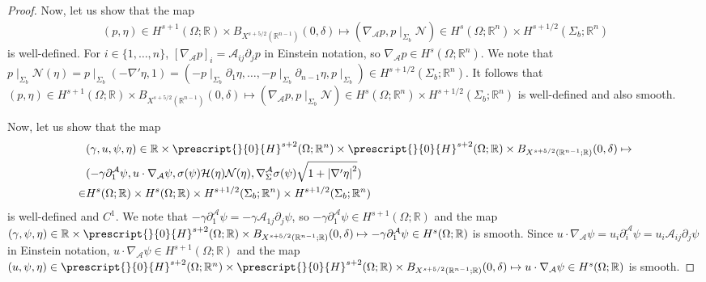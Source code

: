 \documentclass[11pt,letterpaper,reqno]{amsart}
\numberwithin{equation}{section}
\newcommand{\abs}[1]{\left\lvert#1\right\rvert}
\begin{document}
\begin{proof}
    Now, let us show that the map
    \begin{align}
        (p,\eta)\in H^{s+1}(\Omega;\mathbb{R}) \times B_{X^{s+5/2}(\mathbb{R}^{n-1})}(0,\delta) \mapsto (\nabla_{\mathcal{A}}p, p\mid_{\Sigma_{b}}\mathcal{N})\in H^{s}(\Omega;\mathbb{R}^{n}) \times H^{s+1/2}(\Sigma_{b};\mathbb{R}^{n})
    \end{align}
    is well-defined. For \(i \in \{1, \dots, n\}\), \([\nabla_{\mathcal{A}}p]_{i}=\mathcal{A}_{ij}\partial_{j}p\) in Einstein notation, so \(\nabla_{\mathcal{A}}p \in H^{s}(\Omega;\mathbb{R}^{n})\). We note that \(p \mid_{\Sigma_{b}}\mathcal{N}(\eta)=p\mid_{\Sigma_{b}}(-\nabla'\eta,1)=(-p\mid_{\Sigma_{b}}\partial_{1}\eta, \dots, -p\mid_{\Sigma_{b}} \partial_{n-1}\eta, p\mid_{\Sigma_{b}}) \in H^{s+1/2}(\Sigma_{b};\mathbb{R}^{n})\). It follows that \((p,\eta)\in H^{s+1}(\Omega;\mathbb{R}) \times B_{X^{s+5/2}(\mathbb{R}^{n-1})}(0,\delta) \mapsto (\nabla_{\mathcal{A}}p, p\mid_{\Sigma_{b}}\mathcal{N})\in H^{s}(\Omega;\mathbb{R}^{n}) \times H^{s+1/2}(\Sigma_{b};\mathbb{R}^{n})\) is well-defined and also smooth.

    Now, let us show that the map
    \begin{align}
        &(\gamma,u,\psi,\eta) \in \mathbb{R} \times \prescript{}{0}{H}^{s+2}(\Omega;\mathbb{R}^{n}) \times \prescript{}{0}{H}^{s+2}(\Omega;\mathbb{R}) \times B_{X^{s+5/2}(\mathbb{R}^{n-1};\mathbb{R})}(0,\delta) \mapsto \nonumber \\
        &(-\gamma\partial_{1}^{\mathcal{A}}\psi,u \cdot \nabla_{\mathcal{A}}\psi, \sigma(\psi)\mathcal{H}(\eta)\mathcal{N}(\eta),\nabla_{\Sigma}^{\mathcal{A}}\sigma(\psi)\sqrt{1+\abs{\nabla'\eta}^{2}})  \nonumber \\
        \in &H^{s}(\Omega;\mathbb{R}) \times H^{s}(\Omega;\mathbb{R}) \times H^{s+1/2}(\Sigma_{b};\mathbb{R}^{n}) \times H^{s+1/2}(\Sigma_{b};\mathbb{R}^{n})
    \end{align}
    is well-defined and \(C^{1}\). We note that \(-\gamma \partial_{1}^{\mathcal{A}}\psi = -\gamma \mathcal{A}_{1j}\partial_{j}\psi\), so \(-\gamma \partial_{1}^{\mathcal{A}}\psi \in H^{s+1}(\Omega;\mathbb{R})\) and the map \((\gamma,\psi,\eta) \in \mathbb{R} \times \prescript{}{0}{H}^{s+2}(\Omega;\mathbb{R}) \times B_{X^{s+5/2}(\mathbb{R}^{n-1};\mathbb{R})}(0,\delta)\mapsto -\gamma\partial_{1}^{\mathcal{A}}\psi \in H^{s}(\Omega;\mathbb{R})\) is smooth. Since \(u \cdot \nabla_{\mathcal{A}}\psi =u_{i}\partial_{i}^{\mathcal{A}}\psi=u_{i}\mathcal{A}_{ij}\partial_{j}\psi\) in Einstein notation, \(u \cdot \nabla_{\mathcal{A}}\psi \in H^{s+1}(\Omega;\mathbb{R})\) and the map \((u,\psi,\eta) \in \prescript{}{0}{H}^{s+2}(\Omega;\mathbb{R}^{n}) \times \prescript{}{0}{H}^{s+2}(\Omega;\mathbb{R}) \times B_{X^{s+5/2}(\mathbb{R}^{n-1};\mathbb{R})}(0,\delta) \mapsto u \cdot \nabla_{\mathcal{A}}\psi \in H^{s}(\Omega;\mathbb{R})\) is smooth.
    

\end{proof}
\end{document}
